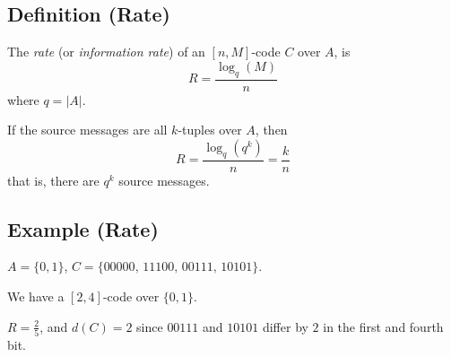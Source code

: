 \begin{defbox}
    \subsection{Definition (Rate)}
    The \emph{rate} (or \emph{information rate}) of an $ [n,M] $-code $ C $ over
    $ A $, is
    \[ R=\frac{\log_q(M)}{n} \]
    where $ q=|A| $.

    If the source messages are all $ k $-tuples over $ A $, then
    \[ R=\frac{\log_q(q^k)}{n}=\frac{k}{n}  \]
    that is, there are $ q^k $ source messages.
\end{defbox}

\begin{exbox}
    \subsection{Example (Rate)}
    $ A=\{0,1\} $, $ C=\{00000,\,11100,\,00111,\,10101\} $.
    
    We have a $ [2,4] $-code over $ \{0,1\} $.
    
    $ R=\frac{2}{5} $, and $ d(C)=2 $ since $ 00111 $ and $ 10101 $
    differ by $ 2 $ in the first and fourth bit.
\end{exbox}